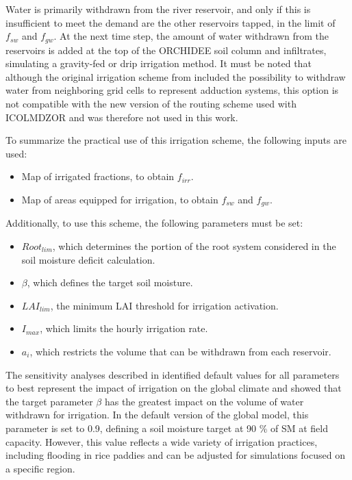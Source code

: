 Water is primarily withdrawn from the river reservoir, and only if this is insufficient to meet the demand are the other reservoirs tapped, in the limit of $f_{sw}$ and $f_{gw}$.
At the next time step, the amount of water withdrawn from the reservoirs is added at the top of the ORCHIDEE soil column and infiltrates, simulating a gravity-fed or drip irrigation method.
It must be noted that although the original irrigation scheme from \citet{arboleda-obando_validation_2024} included the possibility to withdraw water from neighboring grid cells to represent adduction systems, this option is not compatible with the new version of the routing scheme used with ICOLMDZOR and was therefore not used in this work.

To summarize the practical use of this irrigation scheme, the following inputs are used:
\begin{itemize}
    \item Map of irrigated fractions, to obtain $f_{irr}$.
    \item Map of areas equipped for irrigation, to obtain $f_{sw}$ and $f_{gw}$.
\end{itemize}

Additionally, to use this scheme, the following parameters must be set:
\begin{itemize}
    \item $Root_{lim}$, which determines the portion of the root system considered in the soil moisture deficit calculation.
    \item $\beta$, which defines the target soil moisture.
    \item $LAI_{lim}$, the minimum LAI threshold for irrigation activation.
    \item $I_{max}$, which limits the hourly irrigation rate.
    \item $a_i$, which restricts the volume that can be withdrawn from each reservoir.
\end{itemize}

The sensitivity analyses described in \citet{arboleda-obando_validation_2024} identified default values for all parameters to best represent the impact of irrigation on the global climate and showed that the target parameter $\beta$ has the greatest impact on the volume of water withdrawn for irrigation.
In the default version of the global model, this parameter is set to 0.9, defining a soil moisture target at 90 \% of SM at field capacity. However, this value reflects a wide variety of irrigation practices, including flooding in rice paddies and can be adjusted for simulations focused on a specific region. %

